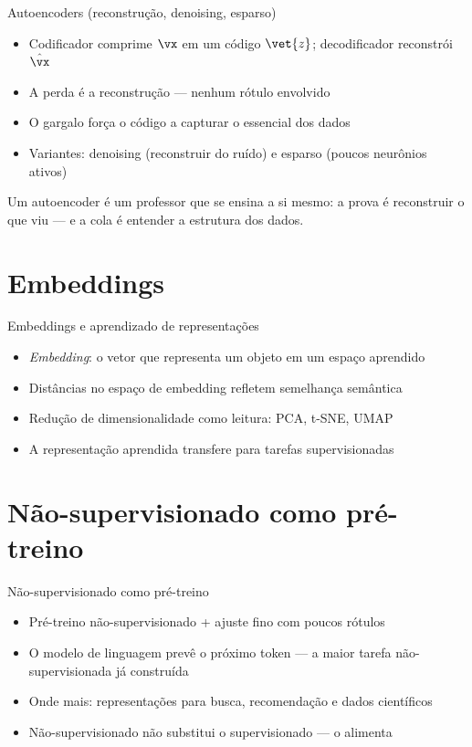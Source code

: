 \documentclass[aspectratio=169, 11pt]{beamer}
\begin{document}
\begin{frame}{Autoencoders (reconstrução, denoising, esparso)}
  \begin{itemize}\setlength{\itemsep}{0.4ex}
    \item Codificador comprime $\vx$ em um código $\vet{z}$; decodificador
          reconstrói $\hat{\vx}$
    \item A perda é a reconstrução — nenhum rótulo envolvido
    \item O gargalo força o código a capturar o essencial dos dados
    \item Variantes: denoising (reconstruir do ruído) e esparso (poucos
          neurônios ativos)
  \end{itemize}
  \begin{ideiabox}
    Um autoencoder é um professor que se ensina a si mesmo: a prova é
    reconstruir o que viu — e a cola é entender a estrutura dos dados.
  \end{ideiabox}
\end{frame}

\section{Embeddings}

\begin{frame}{Embeddings e aprendizado de representações}
  \begin{itemize}\setlength{\itemsep}{0.4ex}
    \item \emph{Embedding}: o vetor que representa um objeto em um espaço
          aprendido
    \item Distâncias no espaço de embedding refletem semelhança semântica
    \item Redução de dimensionalidade como leitura: PCA, t-SNE, UMAP
    \item A representação aprendida transfere para tarefas supervisionadas
  \end{itemize}
\end{frame}

\section{Não-supervisionado como pré-treino}

\begin{frame}{Não-supervisionado como pré-treino}
  \begin{itemize}\setlength{\itemsep}{0.4ex}
    \item Pré-treino não-supervisionado + ajuste fino com poucos rótulos
    \item O modelo de linguagem prevê o próximo token — a maior tarefa
          não-supervisionada já construída
    \item Onde mais: representações para busca, recomendação e dados
          científicos
    \item Não-supervisionado não substitui o supervisionado — o alimenta
  \end{itemize}
\end{frame}
\end{document}
